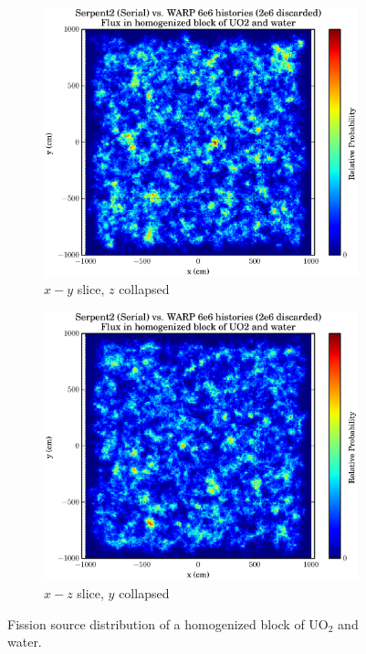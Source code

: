 \begin{figure}[h!]
\centering
\begin{subfigure}{.5\textwidth}
  \centering
  \includegraphics[width=\linewidth]{graphics/finalresults/homfuel_fiss1.eps}
  \caption{$x-y$ slice, $z$ collapsed}
  \label{fig:sub1}
\end{subfigure}%
\begin{subfigure}{.5\textwidth}
  \centering
  \includegraphics[width=\linewidth]{graphics/finalresults/homfuel_fiss2.eps}
  \caption{$x-z$ slice, $y$ collapsed}
  \label{fig:sub2}
\end{subfigure}
\caption{Fission source distribution of a homogenized block of UO$_2$ and water. \label{homfuel_fiss} }
\end{figure}

